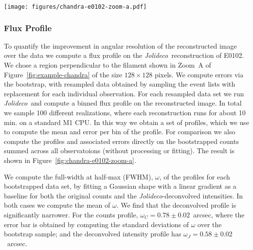 \documentclass[twocolumn]{aastex631}
\newcommand{\jolideco}{\textit{Jolideco}~}
\newcommand{\jolideconospace}{\textit{Jolideco}}
\begin{document}
    \begin{figure*}
        \begin{centering}
            \texttt{[image: figures/chandra-e0102-zoom-a.pdf]}
            \caption{
                The left panel shows the deconvolved flux and counts profile of the region illustrated in the right panel. The thick solid and dashed lines represent the mean of 100 bootstrapped observations. The counts profile is summed (stacked) across all observations, while the \jolideco profile is computed from a single joint reconstruction of all observations. The associated $3\sigma$ error band is shown transparent in the background, for both profiles. Both profiles are normalized such that they integrate to unity and are aligned such that the position of their peak coincides. 
            }
            \label{fig:chandra-e0102-zoom-a}
        \end{centering}
    \end{figure*}
    
    \subsubsection{Flux Profile}
    To quantify the improvement in angular resolution of the reconstructed image over the data we compute a flux profile on the \jolideco reconstruction of E0102. We chose a region perpendicular to the filament shown in Zoom~A of Figure~\ref{fig:example-chandra} of the size $128\times128$ pixels. We compute errors via the bootstrap, with resampled data obtained by sampling the event lists with replacement for each individual observation. For each resampled data set we run \jolideco and compute a binned flux profile on the reconstructed image. In total we sample 100 different realizations, where each reconstruction runs for about 10 min. on a standard M1 CPU. In this way we obtain a set of profiles, which we use to compute the mean and error per bin of the profile. For comparison we also compute the profiles and associated errors directly on the bootstrapped counts summed across all observatoions (without processing or fitting). The result is shown in Figure~\ref{fig:chandra-e0102-zoom-a}.

    We compute the full-width at half-max (FWHM), $\omega$, of the profiles for each bootstrapped data set, by fitting a Gaussian shape with a linear gradient as a baseline for both the original counts and the \jolideconospace-deconvolved intensities. In both cases we compute the mean of $\omega$. We find that the deconvolved profile is significantly narrower. For the counts profile, $\omega_C=0.78 \pm 0.02$~arcsec, where the error bar is obtained by computing the standard deviations of $\omega$ over the bootstrap sample; and the deconvolved intensity profile has $\omega_J=0.58 \pm 0.02$~arcsec.
\end{document}

